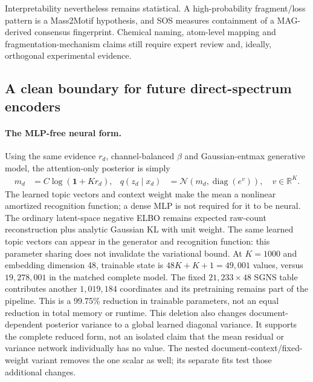 \documentclass[10pt,a4paper]{article}
\begin{document}
Interpretability nevertheless remains statistical. A high-probability
fragment/loss pattern is a Mass2Motif hypothesis, and SOS measures containment
of a MAG-derived consensus fingerprint. Chemical naming, atom-level mapping and
fragmentation-mechanism claims still require expert review and, ideally,
orthogonal experimental evidence.

\subsection{A clean boundary for future direct-spectrum encoders}
\label{sec:future-spectrum-encoder}

\paragraph{The MLP-free neural form.}
Using the same evidence $r_d$, channel-balanced $\beta$ and Gaussian-entmax
generative model, the attention-only posterior is simply
\begin{align}
 m_d&=C\log(\mathbf{1}+Kr_d),&
 q(z_d\mid x_d)&=\mathcal N\!\left(m_d,\operatorname{diag}(e^v)\right),
 \quad v\in\mathbb R^K.\label{eq:attention-only-posterior}
\end{align}
The learned topic vectors and context weight make the mean a nonlinear
amortized recognition function; a dense MLP is not required for it to be
neural. The ordinary latent-space negative ELBO remains expected raw-count
reconstruction plus analytic Gaussian KL with unit weight. The same learned
topic vectors can appear in the generator and recognition function: this
parameter sharing does not invalidate the variational bound.
At $K=1000$ and embedding dimension 48, trainable state is $48K+K+1=49{,}001$
values, versus $19{,}278{,}001$ in the matched complete model. The fixed
$21{,}233\times48$ SGNS table contributes another $1{,}019{,}184$ coordinates
and its pretraining remains part of the pipeline. This is a 99.75\% reduction
in trainable parameters, not an equal reduction in total memory or runtime.
This deletion also changes document-dependent posterior variance to a global
learned diagonal variance. It supports the complete reduced form, not an
isolated claim that the mean residual or variance network individually has
no value. The nested document-context/fixed-weight variant removes the one
scalar as well; its separate fits test those additional changes.
\end{document}
